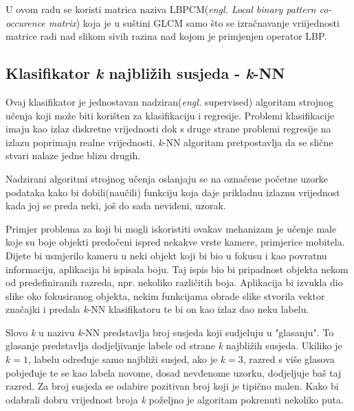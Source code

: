 \documentclass[times, utf8, zavrsni]{fer}
\begin{document}
U ovom radu se koristi matrica naziva LBPCM(\textit{engl. Local binary pattern co-occurence matrix})
koja je u suštini GLCM samo što se izračnavanje vriijednosti matrice 
radi nad slikom sivih razina nad kojom je primjenjen operator LBP.

\newpage

\subsection{Klasifikator \textit{k} najbližih susjeda - \textit{k}-NN}

Ovaj klasifikator je jednostavan nadziran(\textit{engl.} supervised)
algoritam strojnog učenja koji može biti korišten za klasifikaciju
i regresije. Problemi klasifikacije imaju kao izlaz diskretne vrijednosti
dok s druge strane problemi regresije na izlazu poprimaju realne vrijednosti.
\textit{k}-NN algoritam pretpostavlja da se slične stvari nalaze 
jedne blizu drugih.

\bigbreak

Nadzirani algoritmi strojnog učenja oslanjaju se na označene početne uzorke
podataka kako bi dobili(naučili) funkciju koja daje prikladnu izlaznu vrijednost
kada joj se preda neki, još do sada neviđeni, uzorak. 

\bigbreak

Primjer problema 
za koji bi mogli iskoristiti ovakav mehanizam je učenje male koje su boje
objekti predočeni ispred nekakve vrste kamere, primjerice mobitela. Dijete
bi usmjerilo kameru u neki objekt koji bi bio u fokusu i kao povratnu informaciju,
aplikacija bi ispisala boju. Taj ispis bio bi pripadnost objekta nekom od predefiniranih 
razreda, npr. nekoliko različitih boja. Aplikacija bi izvukla 
dio slike oko fokusiranog objekta, nekim funkcijama obrade slike stvorila
vektor značajki i predala \textit{k}-NN klasifikatoru te bi on kao izlaz dao 
neku labelu. 

\bigbreak

Slovo \textit{k} u nazivu \textit{k}-NN predstavlja broj susjeda koji sudjeluju
u "glasanju". To glasanje predstavlja dodjeljivanje labele od strane \textit{k}
najbližih susjeda. Ukiliko je \(k=1\), labelu određuje samo najbliži susjed,
ako je \(k=3\), razred s više glasova pobjeđuje te se kao labela novome, dosad
nevđenome uzorku, dodjeljuje baš taj razred. Za broj susjeda se odabire pozitivan
broj koji je tipično malen. Kako bi odabrali dobru vrijednost broja \textit{k} poželjno
je algoritam pokrenuti nekoliko puta. 
\end{document}
